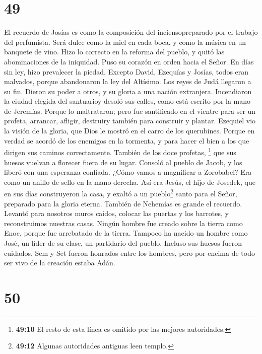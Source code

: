 \hypertarget{section-48}{%
\section{49}\label{section-48}}

 El recuerdo de Josías es como la composición del
inciensopreparado por el trabajo del perfumista. Será dulce como la miel
en cada boca, y como la música en un banquete de vino. 
Hizo lo correcto en la reforma del pueblo, y quitó las abominaciones de
la iniquidad.  Puso su corazón en orden hacia el Señor. En
días sin ley, hizo prevalecer la piedad.  Excepto David,
Ezequías y Josías, todos eran malvados, porque abandonaron la ley del
Altísimo. Los reyes de Judá llegaron a su fin.  Dieron su
poder a otros, y su gloria a una nación extranjera. 
Incendiaron la ciudad elegida del santuarioy desoló sus calles, como
está escrito por la mano de Jeremías.  Porque lo
maltrataron; pero fue santificado en el vientre para ser un profeta,
arrancar, afligir, destruiry también para construir y plantar.
 Ezequiel vio la visión de la gloria, que Dios le mostró
en el carro de los querubines.  Porque en verdad se acordó
de los enemigos en la tormenta, y para hacer el bien a los que dirigen
sus caminos correctamente.  También de los doce profetas,
\footnote{\textbf{49:10} El resto de esta línea es omitido por las
  mejores autoridades.} que sus huesos vuelvan a florecer fuera de su
lugar. Consoló al pueblo de Jacob, y los liberó con una esperanza
confiada.  ¿Cómo vamos a magnificar a Zorobabel? Era como
un anillo de sello en la mano derecha.  Así era Jesús, el
hijo de Josedek, que en sus días construyeron la casa, y exaltó a un
pueblo\footnote{\textbf{49:12} Algunas autoridades antiguas leen templo.}
santo para el Señor, preparado para la gloria eterna. 
También de Nehemías es grande el recuerdo. Levantó para nosotros muros
caídos, colocar las puertas y los barrotes, y reconstruimos nuestras
casas.  Ningún hombre fue creado sobre la tierra como
Enoc, porque fue arrebatado de la tierra.  Tampoco ha
nacido un hombre como José, un líder de su clase, un partidario del
pueblo. Incluso sus huesos fueron cuidados.  Sem y Set
fueron honrados entre los hombres, pero por encima de todo ser vivo de
la creación estaba Adán.

\hypertarget{section-49}{%
\section{50}\label{section-49}}

